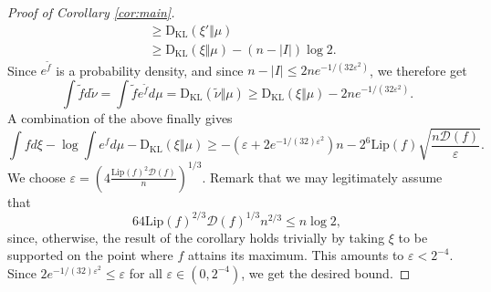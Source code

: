 \documentclass[12pt]{article}
\def \eps {\varepsilon}
\def \Lip {\mathrm {Lip}}
\def \KL {\mathrm{D}_{\mathrm{KL}}}
\def \Comp { \mathcal{D} }
\theoremstyle{definition}
\theoremstyle{remark}
\begin{document}
\begin{proof} [Proof of Corollary \ref{cor:main}]
\begin{align*}
	& \geq \KL(\xi' \Vert \mu) \\
	& \geq \KL(\xi \Vert \mu) - (n-|I|) \log 2.
	\end{align*}	
	Since $e^{\tilde f}$ is a probability density, and since $n-|I| \leq 2n e^{-1/(32 \eps^2)}$, we therefore get
	$$
	\int \tilde f d \tilde \nu = \int \tilde f e^{\tilde f} d \mu = \KL(\tilde \nu \Vert \mu) \geq \KL(\xi \Vert \mu) - 2n e^{-1/(32 \eps^2)}.
	$$
	A combination of the above finally gives
	$$
	\int f d \xi - \log \int e^{f} d \mu - \KL(\xi \Vert \mu) \geq - \left (\eps + 2 e^{-1/(32)\eps^2} \right ) n - 2^6 \Lip(f) \sqrt{\frac{n \Comp(f)}{\eps}}.
	$$
	We choose $\eps = \left (4 \frac{\Lip(f)^2 \Comp(f)}{n} \right )^{1/3}$. Remark that we may legitimately assume that $$64 \Lip(f)^{2/3} \Comp(f)^{1/3} n^{2/3} \leq n \log 2,$$
	since, otherwise, the result of the corollary holds trivially by taking $\xi$ to be supported on the point where $f$ attains its maximum. This amounts to $\eps < 2^{-4}$. Since $2 e^{-1/(32)\eps^2} \leq \eps$ for all $\eps \in (0, 2^{-4})$, we get the desired bound.	
\end{proof}
\end{document}
